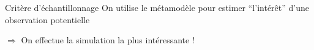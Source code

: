 \begin{frame}
\begin{columns}[t]
\begin{column}{6cm}
\end{column}
\end{columns}

\begin{exampleblock}{Critère d'échantillonnage}
  On utilise le métamodèle pour estimer  ``l'intérêt'' d'une observation potentielle 
  
  $\Rightarrow$ On effectue la simulation la plus intéressante !
\end{exampleblock}

\end{frame}

